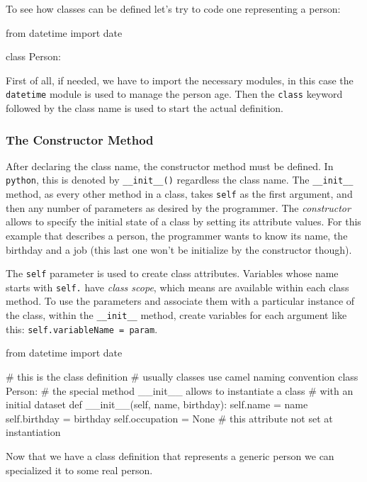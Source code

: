 To see how classes can be defined let's try to code one representing a person:
\begin{ipython}
from datetime import date        

class Person:
\end{ipython}

First of all, if needed, we have to import the necessary modules, in this case the \texttt{datetime} module is used to manage the person age.
Then the \texttt{class} keyword followed by the class name is used to start the actual definition.

\subsubsection{The Constructor Method}\label{the-constructor-method}

After declaring the class name, the constructor method must be defined. In \texttt{python}, this is denoted by \texttt{\_\_init\_\_()} regardless the class name. The \texttt{\_\_init\_\_} method, as every other method in a class, takes \texttt{self} as the first argument, and then any number of parameters as desired by the programmer. The \emph{constructor} allows to specify the initial state of a class by setting its attribute values. For this example that describes a person, the programmer wants to know its name, the birthday and a job (this last one won't be initialize by the constructor though).

The \texttt{self} parameter is used to create class attributes. Variables whose name starts with \texttt{self.} have \emph{class scope}, which means are available within each class method. To use the parameters and associate them with a particular instance of the class, within the \texttt{\_\_init\_\_} method, create variables for each argument like this: \texttt{self.variableName\ =\ param}.

\begin{ipython}
from datetime import date

# this is the class definition
# usually classes use camel naming convention
class Person:
    # the special method __init__ allows to instantiate a class
    # with an initial dataset
    def __init__(self, name, birthday):
        self.name = name
        self.birthday = birthday
        self.occupation = None # this attribute not set at instantiation
\end{ipython}

Now that we have a class definition that represents a generic person we can specialized it to some real person.

